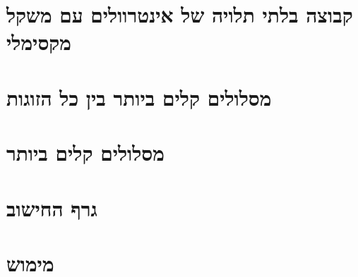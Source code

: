\documentclass[]{article}
\begin{document}
	



\section*{קבוצה בלתי תלויה של אינטרוולים עם משקל מקסימלי}

\section*{מסלולים קלים ביותר בין כל הזוגות}

\section*{מסלולים קלים ביותר}

\section*{גרף החישוב}

\section{מימוש}
\end{document}
